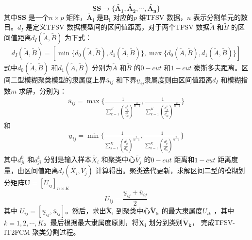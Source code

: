 \begin{equation}\label{eq:eq-2}
    \bm{SS} \to \lbrace \bm{\tilde{A_1}}, \bm{\tilde{A_2}},\bm{\cdots}, \bm{\tilde{A_n}} \rbrace
\end{equation}
其中$\bm{SS}$ 是一个$n \times p$ 矩阵，$\bm{\tilde{A_i}}$ 是$\bm{B_i}$ 对应的$p$ 维TFSV 数据，$n$ 表示分割单元的数目。$d_I$ 是定义TFSV 数据模型间的区间值距离，对于两个TFSV 数据$\tilde{A}$ 和$\tilde{B}$ 的区间值距离$d_I (\tilde{A}, \tilde{B})$ 为下式：
\begin{equation}\label{eq:interval}
    \begin{split}
        d _{I} (\tilde{A},\tilde{B}) = [\min \lbrace d_0 (\tilde{A},\tilde{B}),d_1(\tilde{A},\tilde{B}) \rbrace, \max \lbrace d_0(\tilde{A},\tilde{B}), d_1 (\tilde{A},\tilde{B}) \rbrace ]
    \end{split}
\end{equation}
式中$d_0 (\tilde{A},\tilde{B})$ 和$d_1 (\tilde{A},\tilde{B})$ 分别为$\tilde{A}$ 和$\tilde{B}$ 的$0 − cut$ 和$ 1 − cut$ 豪斯多夫距离\cite{zadeh1978fuzzy}。区间二型模糊聚类模型的隶属度上界$\overline{u}_{ij}$ 和下界$\underline{u}_{ij}$隶属度则由区间值距离$d _{I} $ 和模糊指数$m$ 求解，分别为：
\begin{equation}\label{eq:13}
    \begin{split}
        \overline{u}_{ij} = \max \Bigg \lbrace \frac{1}{\sum_{k=1}^K {(\frac{d_{ji}^0}{d_{ki}^0})}^{\frac{2}{m-1}}}, \frac{1}{\sum_{k=1}^K {(\frac{d_{ji}^1}{d_{ki}^1})}^{\frac{2}{m-1}}} \Bigg \rbrace
    \end{split}
\end{equation}
和
\begin{equation}\label{eq:14}
    \begin{split}
        \underline{u}_{ij} = \min \Bigg \lbrace \frac{1}{\sum_{k=1}^K {(\frac{d_{ji}^0}{d_{ki}^0})}^{\frac{2}{m-1}}}, \frac{1}{\sum_{k=1}^K {(\frac{d_{ji}^1}{d_{ki}^1})}^{\frac{2}{m-1}}} \Bigg \rbrace
    \end{split}
\end{equation}
其中$d_{ji}^0$ 和$d_{ji}^1$ 分别是输入样本$\tilde{X_i}$ 和聚类中心$\tilde{V_j}$ 的$0-cut$ 距离和$1-cut$ 距离度量，由区间值距离$d_{I} (\tilde{X_i}, \tilde{V_j})$ 计算得出。聚类迭代更新，求解区间二型的模糊划分矩阵$\bm{U} = [U_{ij}]_{n \times K}$
\begin{equation}\label{eq:21}
    U_{ij} = \frac{\underline{u}_{ij} + \overline{u}_{ij}}{2}
\end{equation}
其中 $U_{ij} = [\underline{u}_{ij}, \overline{u}_{ij}]$。然后，求出$\bm{\tilde{X}_i}$ 到聚类中心$\bm{\tilde{V}_k}$ 的最大隶属度$U_{ik}$ ，其中$k = 1, 2,\cdots, K$。最后根据最大隶属度原则，将$\bm{\tilde{X}_i}$ 划分到类别$\bm{\tilde{V}_k}$， 完成TFSV-IT2FCM 聚类分割过程。

